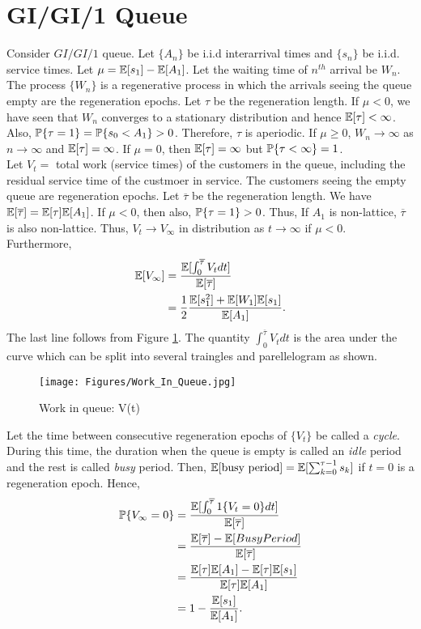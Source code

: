 \documentclass[all-lectures.tex]{subfiles}
\begin{document}
\section{GI/GI/1 Queue}
Consider $GI/GI/1$ queue. Let $\{A_n\}$ be i.i.d interarrival times and $\{s_n\}$ be i.i.d. service times. Let $\mu = \E[s_1] - \E[A_1]$. Let the waiting time of $n^{th}$ arrival be $W_n$. The process $\{W_n\}$ is a regenerative process in which the arrivals seeing the queue empty are the regeneration epochs. Let $\tau$ be the regeneration length. If $\mu<0$, we have seen that  $W_n$ converges to a stationary distribution and hence $\E[\tau]<\infty$. Also, $\P\{\tau = 1\} = \P\{s_0 < A_1\} >0$. Therefore, $\tau$ is aperiodic. If $\mu\geq 0$, $W_n \to \infty$ as $n \to \infty$ and $\E[\tau] = \infty$.  If $\mu =0$, then $\E[\tau]= \infty$ but $\P\{\tau < \infty\} =1$.\\
\indent Let $V_t=$ total work (service times) of the customers in the queue, including the residual service time of the custmoer in service. The customers seeing the empty queue are regeneration epochs. Let $\overline{\tau}$ be the regeneration length. We have $\E[\overline{\tau}] = \E[\tau]\E[A_1]$. If $\mu < 0$, then also, $\P\{\tau =1\}>0$. Thus, If $A_1$ is non-lattice, $\overline{\tau}$ is also non-lattice. Thus, $V_t \to V_\infty$ in distribution as $t \to \infty$ if $\mu <0$.\\
\indent Furthermore, %
\begin{align*}
\E[V_\infty] &= \frac{\E[\int_0^{\overline{\tau}} V_t dt]}{\E[\overline{\tau}]} \\
&= \frac{1}{2} \frac{\E[s_1^2] + \E[W_1]\E[s_1]}{\E[A_1]}.
\end{align*}
The last line follows from Figure \ref{fig:work_in_queue}. The quantity $\int_0^{\overline{\tau}} V_t dt$ is the area under the curve which can be split into several traingles and parellelogram as shown. \\
\begin{figure}
\centering
\texttt{[image: Figures/Work\_In\_Queue.jpg]}
\caption{Work in queue: V(t)}
\label{fig:work_in_queue}
\end{figure}
\indent Let the time between consecutive regeneration epochs of $\{V_t\}$ be called a \textit{cycle}. During this time, the duration when the queue is empty is called an \textit{idle }period and the rest is called \textit{busy} period. Then, $\E[\text{busy period}] = \E[\sum_{k=0}^{\tau -1} s_k]$ if $t=0$ is a regeneration epoch. Hence, 
\begin{align*}
\P\{V_\infty = 0\}  &= \frac{ \E[\int_0^{\overline{\tau}} 1\{V_t=0\}dt]}{\E[\overline{\tau}]} \\
&= \frac{\E[\overline{\tau}]-\E[Busy Period]}{\E[\overline{\tau}]} \\
&= \frac{\E[{\tau}]\E[A_1]-\E[\tau]\E[s_1]}{\E[{\tau}]\E[A_1]} \\
&= 1-\frac{\E[s_1]}{\E[A_1]}.
\end{align*}
\end{document}
